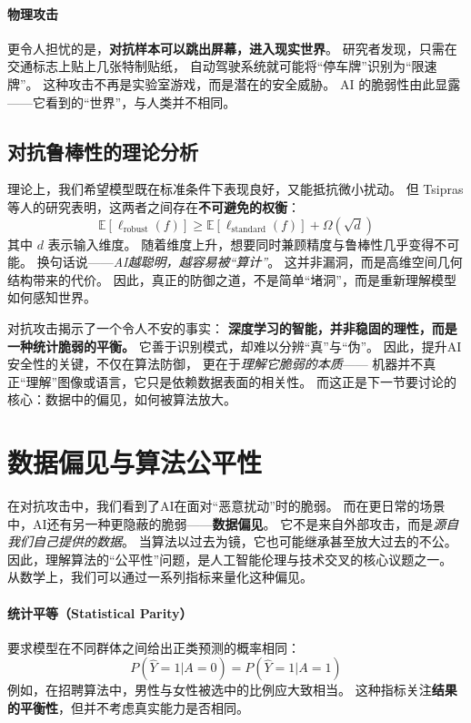 \paragraph{物理攻击}  
更令人担忧的是，\textbf{对抗样本可以跳出屏幕，进入现实世界}。  
研究者发现，只需在交通标志上贴上几张特制贴纸，  
自动驾驶系统就可能将“停车牌”识别为“限速牌”。  
这种攻击不再是实验室游戏，而是潜在的安全威胁。  
AI 的脆弱性由此显露——它看到的“世界”，与人类并不相同。

\subsection{对抗鲁棒性的理论分析}

理论上，我们希望模型既在标准条件下表现良好，又能抵抗微小扰动。  
但 Tsipras 等人的研究表明，这两者之间存在\textbf{不可避免的权衡}：  
$$\mathbb{E}[\ell_{\text{robust}}(f)] \geq \mathbb{E}[\ell_{\text{standard}}(f)] + \Omega(\sqrt{d})$$  
其中 $d$ 表示输入维度。  
随着维度上升，想要同时兼顾精度与鲁棒性几乎变得不可能。  
换句话说——\textit{AI越聪明，越容易被“算计”}。  
这并非漏洞，而是高维空间几何结构带来的代价。  
因此，真正的防御之道，不是简单“堵洞”，而是重新理解模型如何感知世界。

对抗攻击揭示了一个令人不安的事实：  
\textbf{深度学习的智能，并非稳固的理性，而是一种统计脆弱的平衡。}  
它善于识别模式，却难以分辨“真”与“伪”。  
因此，提升AI安全性的关键，不仅在算法防御，  
更在于\textit{理解它脆弱的本质}——  
机器并不真正“理解”图像或语言，它只是依赖数据表面的相关性。  
而这正是下一节要讨论的核心：数据中的偏见，如何被算法放大。

\section{数据偏见与算法公平性}

在对抗攻击中，我们看到了AI在面对“恶意扰动”时的脆弱。  
而在更日常的场景中，AI还有另一种更隐蔽的脆弱——\textbf{数据偏见}。  
它不是来自外部攻击，而是\textit{源自我们自己提供的数据}。  
当算法以过去为镜，它也可能继承甚至放大过去的不公。  
因此，理解算法的“公平性”问题，是人工智能伦理与技术交叉的核心议题之一。  
从数学上，我们可以通过一系列指标来量化这种偏见。

\paragraph{统计平等（Statistical Parity）}  
要求模型在不同群体之间给出正类预测的概率相同：  
$$P(\hat{Y}=1|A=0) = P(\hat{Y}=1|A=1)$$  
例如，在招聘算法中，男性与女性被选中的比例应大致相当。  
这种指标关注\textbf{结果的平衡性}，但并不考虑真实能力是否相同。


